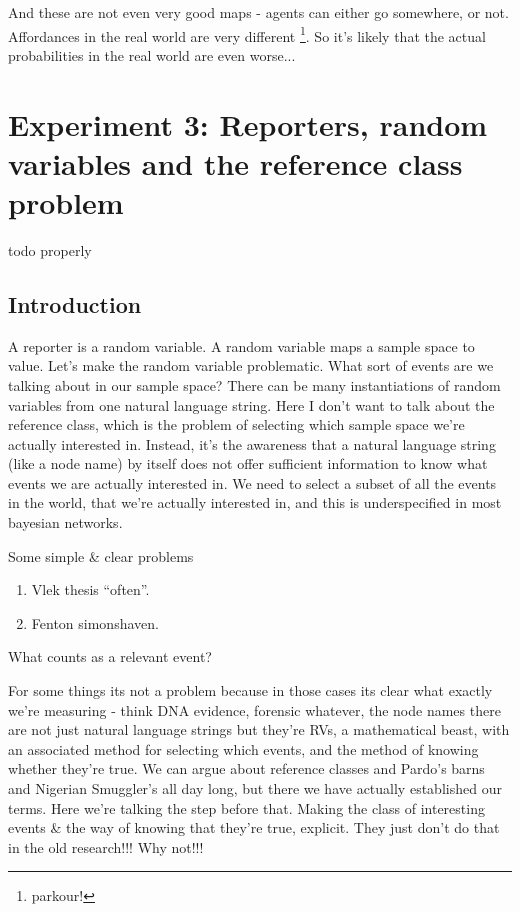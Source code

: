 And these are not even very good maps - agents can either go somewhere, or not. Affordances in the real world are very different \footnote{parkour!}. So it's likely that the actual probabilities in the real world are even worse...


\section{Experiment 3: Reporters, random variables and the reference class problem}

{\color{red} todo properly}

\subsection{Introduction}
A reporter is a random variable. A random variable maps a sample space to value. Let's make the random variable problematic. What sort of events are we talking about in our sample space? There can be many instantiations of random variables from one natural language string. Here I don't want to talk about the reference class, which is the problem of selecting which sample space we're actually interested in. Instead, it's the awareness that a natural language string (like a node name) by itself does not offer sufficient information to know what events we are actually interested in. We need to select a subset of all the events in the world, that we're actually interested in, and this is underspecified in most bayesian networks.

Some simple \& clear problems

\begin{enumerate}
\item Vlek thesis ``often''. 
\item Fenton simonshaven.
\end{enumerate}

What counts as a relevant event?

For some things its not a problem because in those cases its clear what exactly we're measuring - think DNA evidence, forensic whatever, the node names there are not just natural language strings but they're RVs, a mathematical beast, with an associated method for selecting which events, and the method of knowing whether they're true. We can argue about reference classes and Pardo's barns and Nigerian Smuggler's all day long, but there we have actually established our terms. Here we're talking the step before that. Making the class of interesting events \& the way of knowing that they're true, explicit. They just don't do that in the old research!!! Why not!!!

